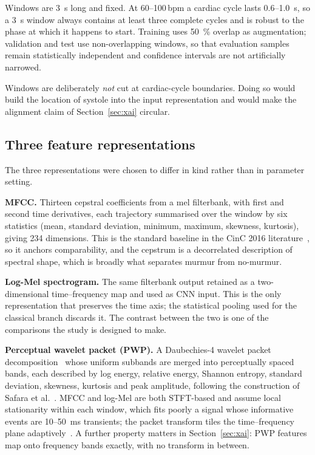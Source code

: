 Windows are \SI{3}{\second} long and fixed. At 60--100\,bpm a cardiac cycle
lasts 0.6--\SI{1.0}{\second}, so a \SI{3}{\second} window always contains at
least three complete cycles and is robust to the phase at which it happens to
start. Training uses \SI{50}{\percent} overlap as augmentation; validation and
test use non-overlapping windows, so that evaluation samples remain
statistically independent and confidence intervals are not artificially
narrowed.

Windows are deliberately \emph{not} cut at cardiac-cycle boundaries. Doing so
would build the location of systole into the input representation and would
make the alignment claim of Section~\ref{sec:xai} circular.

\subsection{Three feature representations}
% 

The three representations were chosen to differ in kind rather than in
parameter setting.

\textbf{MFCC.} Thirteen cepstral coefficients from a mel filterbank, with first
and second time derivatives, each trajectory summarised over the window by six
statistics (mean, standard deviation, minimum, maximum, skewness, kurtosis),
giving 234 dimensions. This is the standard baseline in the CinC 2016
literature~\cite{davis1980comparison,rubin2016classifying}, so it anchors
comparability, and the cepstrum is a decorrelated description of spectral
shape, which is broadly what separates murmur from no-murmur.

\textbf{Log-Mel spectrogram.} The same filterbank output retained as a
two-dimensional time--frequency map and used as CNN input. This is the only
representation that preserves the time axis; the statistical pooling used for
the classical branch discards it. The contrast between the two is one of the
comparisons the study is designed to make.

\textbf{Perceptual wavelet packet (PWP).} A Daubechies-4 wavelet packet
decomposition~\cite{daubechies1988orthonormal} whose uniform subbands are merged
into perceptually spaced bands, each described by log energy, relative energy,
Shannon entropy, standard deviation, skewness, kurtosis and peak amplitude,
following the construction of Safara et al.~\cite{safara2013multi}. MFCC and
log-Mel are both STFT-based and assume local stationarity within each window,
which fits poorly a signal whose informative events are 10--\SI{50}{\milli\second}
transients; the packet transform tiles the time--frequency plane
adaptively~\cite{mallat2008wavelet,coifman1992entropy}. A further property
matters in Section~\ref{sec:xai}: PWP features map onto frequency bands exactly,
with no transform in between.

